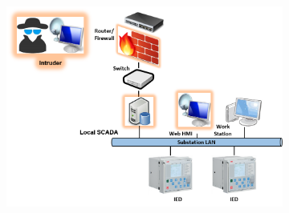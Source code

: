 \begin{figure}[htbp]
\begin{subfigure}{0.16\textwidth}
	\caption{}\label{sfig:graph-B}
	\end{subfigure}
	\begin{subfigure}{0.3\textwidth}
	\includegraphics[width=\textwidth]{C-model.png}
	\caption{}\label{sfig:model-C}
	\end{subfigure}
	\begin{subfigure}{0.12\textwidth}

\end{subfigure}
\end{figure}
